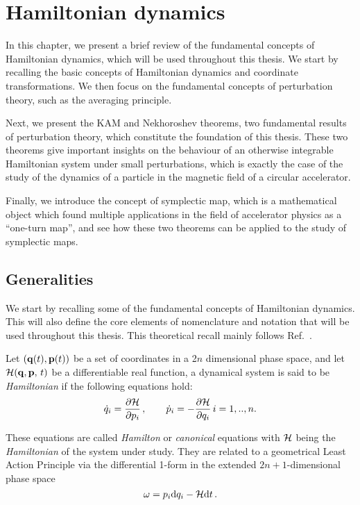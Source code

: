 
\chapter{Hamiltonian dynamics}\label{ch:mathematical_elements}

In this chapter, we present a brief review of the fundamental concepts of Hamiltonian dynamics, which will be used throughout this thesis. We start by recalling the basic concepts of Hamiltonian dynamics and coordinate transformations. We then focus on the fundamental concepts of perturbation theory, such as the averaging principle.

Next, we present the KAM and Nekhoroshev theorems, two fundamental results of perturbation theory, which constitute the foundation of this thesis. These two theorems give important insights on the behaviour of an otherwise integrable Hamiltonian system under small perturbations, which is exactly the case of the study of the dynamics of a particle in the magnetic field of a circular accelerator.

Finally, we introduce the concept of symplectic map, which is a mathematical object which found multiple applications in the field of accelerator physics as a ``one-turn map'', and see how these two theorems can be applied to the study of symplectic maps.

\section{Generalities}\label{sec:1:hamiltonian}

We start by recalling some of the fundamental concepts of Hamiltonian dynamics. This will also define the core elements of nomenclature and notation that will be used throughout this thesis. This theoretical recall mainly follows Ref.~\cite{Arnold:937549}.

Let $(\vb{q}(t),\vb{p}(t))$ be a set of coordinates in a 2$n$ dimensional phase space, and let $\mathcal{H}(\vb{q},\vb{p},\, t)$ be a differentiable real function, a dynamical system is said to be \textit{Hamiltonian} if the following equations hold:
%
\begin{equation} 
	\dot q_i = \pdv{\mathcal{H}}{p_i}
		\,,\qquad 		\dot p_i = -\pdv{\mathcal{H}}{q_i} \, i=1,..,n.
	\label{hameq}
 \end{equation} 

These equations are called \textit{Hamilton} or \textit{canonical} equations with $\mathcal{H}$ being the \textit{Hamiltonian} of the system under study. They are related to a geometrical Least Action Principle via the differential 1-form in the extended $2n+1$-dimensional phase space 
%
\begin{equation} \omega = p_i \dd q_i -\mathcal{H} \dd t \, .  
\end{equation}

